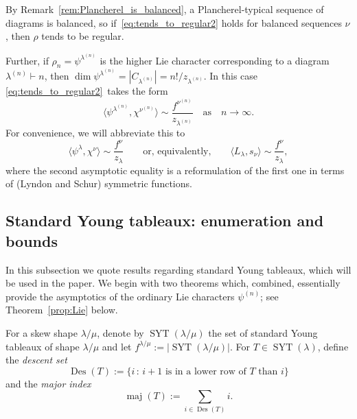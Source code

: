 \documentclass[12pt]%
{amsart}
\renewcommand\S{{\mathcal S}}
\DeclareMathOperator\Des{Des}
\DeclareMathOperator\maj{maj} \DeclareMathOperator\Inv{Inv}
\DeclareMathOperator\Reg{Reg}
\newcommand{\la}{{\lambda}}
\theoremstyle{plain}
\theoremstyle{definition}
\theoremstyle{remark}
\newcommand{\SYT}{{\operatorname{SYT}}}
\newcommand{\todo}[1]{\vspace{5 mm}\par \noindent
	\marginpar{\textsc{ToDo}} \framebox{\begin{minipage}[c]{0.95
				\textwidth}
			#1 \end{minipage}}\vspace{5 mm}\par}
\begin{document}
By 
Remark~\ref{rem:Plancherel_is_balanced},
a Plancherel-typical sequence of diagrams is balanced, so if~\eqref{eq:tends_to_regular2} holds for balanced sequences $\nu$, then $\rho$ tends to be regular. 



Further, if $\rho_n = \psi^{\la^{(n)}}$ is %
the higher Lie character corresponding to a diagram $\la^{(n)} \vdash n$,
then $\dim\psi^{\la^{(n)}} = |C_{\la^{(n)}}| = n!/z_{\la^{(n)}}$.
In this case
\eqref{eq:tends_to_regular2}~takes the form
\[
    \langle \psi^{\la^{(n)}},\chi^{\nu^{(n)}} \rangle
    \sim
    \frac{f^{\nu^{(n)}}}{z_{\la^{(n)}}} 
    \quad \text{as} \quad n\to \infty.
\]
For convenience, we will abbreviate this to 
\begin{equation}\label{claim}
    \langle \psi^\la,\chi^\nu\rangle\sim\frac{f^\nu}{z_\la}
    \qquad\text{or, equivalently,}\qquad
    \langle L_\la,s_\nu\rangle\sim\frac{f^\nu}{z_\la},
\end{equation}
where the second asymptotic equality is a reformulation of the first one 
in terms of (Lyndon and Schur) symmetric functions.

\subsection%
{Standard Young tableaux: enumeration and bounds}
\label{sec:useful_results}



In this subsection we quote results regarding 
standard Young tableaux, which will be used in the paper. 
We begin with two theorems which, combined, essentially provide the asymptotics of the ordinary Lie characters $\psi^{(n)}$; see Theorem~\ref{prop:Lie} below.

For a skew shape $\la/\mu$, 
denote by $\SYT(\lambda/\mu)$ the set of standard Young tableaux of shape $\la/\mu$ and let $f^{\la/\mu}:=|\SYT(\la/\mu)|$. 
For $T\in \SYT(\la)$, define the {\em descent set}
\[
    \Des(T)
    := \{i \,:\, i+1 \text{ is in a lower row of } T \text{ than } i\} 
\]
and the {\em major index} 
\[
    \maj(T) := \sum_{i \in \Des(T)} i.
\]
\end{document}

